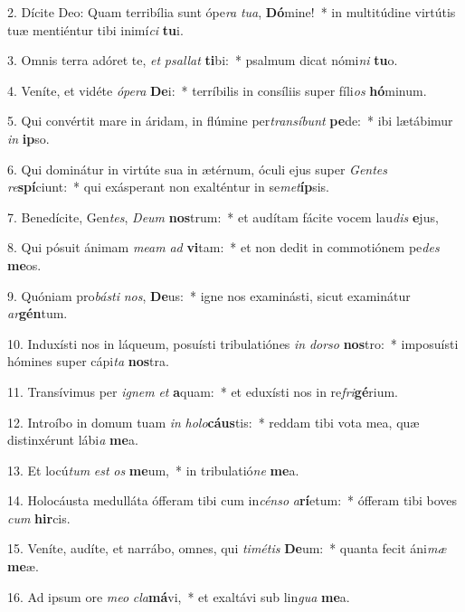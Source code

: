 2. Dícite Deo: Quam terribília sunt ópe\textit{ra} \textit{tu}\textit{a}, \textbf{Dó}mine!~*  in multitúdine virtútis tuæ mentiéntur tibi inimí\textit{ci} \textbf{tu}i.\

3. Omnis terra adóret te, \textit{et} \textit{psal}\textit{lat} \textbf{ti}bi:~*  psalmum dicat nómi\textit{ni} \textbf{tu}o.\

4. Veníte, et vidéte \textit{ó}\textit{pe}\textit{ra} \textbf{De}i:~*  terríbilis in consíliis super fíli\textit{os} \textbf{hó}minum.\

5. Qui convértit mare in áridam, in flúmine per\textit{trans}\textit{í}\textit{bunt} \textbf{pe}de:~*  ibi lætábimur \textit{in} \textbf{ip}so.\

6. Qui dominátur in virtúte sua in ætérnum, óculi ejus super \textit{Gen}\textit{tes} \textit{re}\textbf{spí}ciunt:~*  qui exásperant non exalténtur in se\textit{met}\textbf{íp}sis.\

7. Benedícite, Gen\textit{tes}, \textit{De}\textit{um} \textbf{nos}trum:~*  et audítam fácite vocem lau\textit{dis} \textbf{e}jus,\

8. Qui pósuit ánimam \textit{me}\textit{am} \textit{ad} \textbf{vi}tam:~*  et non dedit in commotiónem pe\textit{des} \textbf{me}os.\

9. Quóniam pro\textit{bás}\textit{ti} \textit{nos}, \textbf{De}us:~*  igne nos examinásti, sicut examinátur \textit{ar}\textbf{gén}tum.\

10. Induxísti nos in láqueum, posuísti tribulatiónes \textit{in} \textit{dor}\textit{so} \textbf{nos}tro:~*  imposuísti hómines super cápi\textit{ta} \textbf{nos}tra.\

11. Transívimus per \textit{i}\textit{gnem} \textit{et} \textbf{a}quam:~*  et eduxísti nos in re\textit{fri}\textbf{gé}rium.\

12. Introíbo in domum tuam \textit{in} \textit{ho}\textit{lo}\textbf{cáus}tis:~*  reddam tibi vota mea, quæ distinxérunt lábi\textit{a} \textbf{me}a.\

13. Et locú\textit{tum} \textit{est} \textit{os} \textbf{me}um,~*  in tribulatió\textit{ne} \textbf{me}a.\

14. Holocáusta medulláta ófferam tibi cum in\textit{cén}\textit{so} \textit{a}\textbf{rí}etum:~*  ófferam tibi boves \textit{cum} \textbf{hir}cis.\

15. Veníte, audíte, et narrábo, omnes, qui \textit{ti}\textit{mé}\textit{tis} \textbf{De}um:~*  quanta fecit áni\textit{mæ} \textbf{me}æ.\

16. Ad ipsum ore \textit{me}\textit{o} \textit{cla}\textbf{má}vi,~*  et exaltávi sub lin\textit{gua} \textbf{me}a.\

